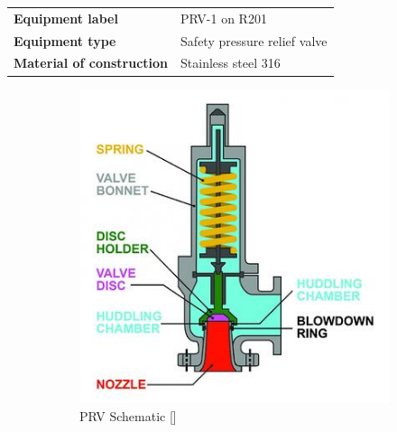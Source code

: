 \begin{table}[H]
    \centering
    \begin{tabular}{@{}l|l@{}}
    \toprule
      \textbf{Equipment label}  & PRV-1 on R201\\
       \textbf{Equipment type}  & Safety pressure relief valve \\
       \textbf{Material of construction} & Stainless steel 316 \\
       \bottomrule
    \end{tabular}
\end{table}


\begin{figure}[H]
    \centering
    \begin{subfigure}{0.49\linewidth}
        \includegraphics[width=\linewidth]{chapters/Z-support/figures/PSV_Diagram.jpg}
        \caption{PRV Schematic []}
    \end{subfigure}
    \begin{subfigure}{0.49\linewidth}

\end{subfigure}
\end{figure}
